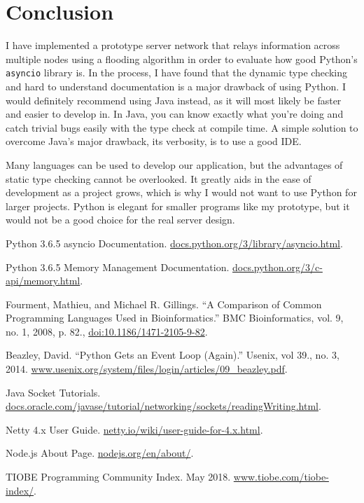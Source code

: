 \documentclass[letterpaper,twocolumn,10pt]{article}
\begin{document}
\section{Conclusion}

I have implemented a prototype server network that relays information across multiple nodes using a flooding algorithm in order to evaluate how
good Python's \texttt{asyncio} library is. In the process, I have found that the dynamic type checking and hard to understand documentation is a major
drawback of using Python. I would definitely recommend using Java instead, as it will most likely be faster and easier to develop in. In Java, you can know
exactly what you're doing and catch trivial bugs easily with the type check at compile time. A simple solution to overcome Java's major drawback, its
verbosity, is to use a good IDE.

Many languages can be used to develop our application, but the advantages of static type checking cannot be overlooked. It greatly aids in the ease of
development as a project grows, which is why I would not want to use Python for larger projects. Python is elegant for smaller programs like my
prototype, but it would not be a good choice for the real server design.

\begin{thebibliography}{9}
        \raggedright
        Python 3.6.5 asyncio Documentation. \url{docs.python.org/3/library/asyncio.html}.

        Python 3.6.5 Memory Management Documentation. \url{docs.python.org/3/c-api/memory.html}.

        Fourment, Mathieu, and Michael R. Gillings.
        ``A Comparison of Common Programming Languages Used in Bioinformatics.''
        BMC Bioinformatics, vol. 9, no. 1, 2008, p. 82.,
        \href{https://doi.org/10.1186/1471-2105-9-82}{doi:10.1186/1471-2105-9-82}.

        Beazley, David. ``Python Gets an Event Loop (Again).'' Usenix, vol 39., no. 3, 2014.
        \url{www.usenix.org/system/files/login/articles/09_beazley.pdf}.

        Java Socket Tutorials. \url{docs.oracle.com/javase/tutorial/networking/sockets/readingWriting.html}.

        Netty 4.x User Guide. \url{netty.io/wiki/user-guide-for-4.x.html}.

        Node.js About Page. \url{nodejs.org/en/about/}.

        TIOBE Programming Community Index. May 2018. \url{www.tiobe.com/tiobe-index/}.
\end{thebibliography}
\end{document}

